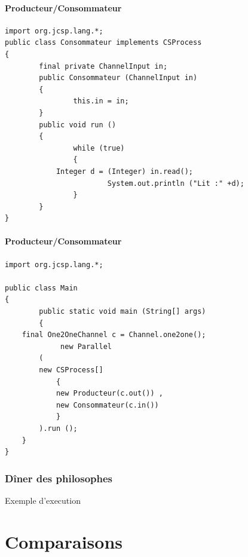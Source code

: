 \documentclass[slidetop,11pt]{beamer}
\begin{document}
\begin{frame}[containsverbatim]
\framesubtitle{Producteur/Consommateur}
\begin{lstlisting}[frame=trBL,title={Producteurs-Consommateurs: Consommateur.java}]
import org.jcsp.lang.*;
public class Consommateur implements CSProcess
{
        final private ChannelInput in;
        public Consommateur (ChannelInput in)
        {
                this.in = in;
        }
        public void run ()
        {
                while (true)
                {
			Integer d = (Integer) in.read();
                        System.out.println ("Lit :" +d);
                }
        }
}
\end{lstlisting}
\end{frame}

\begin{frame}[containsverbatim]
\framesubtitle{Producteur/Consommateur}
\begin{lstlisting}[frame=trBL,title={Producteurs-Consommateurs: Main.java}]
import org.jcsp.lang.*;

public class Main
{
        public static void main (String[] args)
        {
	final One2OneChannel c = Channel.one2one();
             new Parallel
		(
		new CSProcess[]
			{
			new Producteur(c.out()) ,
			new Consommateur(c.in())
			} 
		).run ();
	}
}
\end{lstlisting}
\end{frame}

\subsubsection{D\^iner des philosophes}
\begin{frame}
Exemple d'execution
\end{frame}

\section{Comparaisons}
\end{document}
